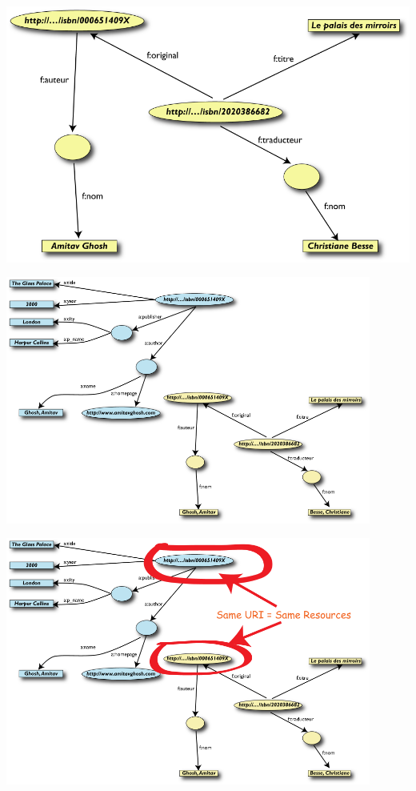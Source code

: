 \documentclass[a4paper,landscape,headrule,footrule,xetex]{foils}
\begin{document}

\noindent
\includegraphics[width=\textwidth]{../pics/img20.png}


\noindent
\includegraphics[width=0.9\textwidth]{../pics/img21.png}


\noindent
\includegraphics[width=0.9\textwidth]{../pics/img22.png}
\end{document}
